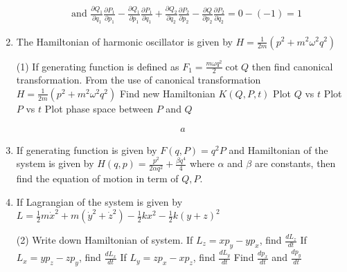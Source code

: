 \begin{enumerate}
\begin{answer}
\begin{align*}
		&\text{and }
		\frac{\partial Q_{1}}{\partial q_{1}} \frac{\partial P_{1}}{\partial p_{1}}-\frac{\partial Q_{1}}{\partial p_{1}} \frac{\partial P_{1}}{\partial q_{1}}+\frac{\partial Q_{2}}{\partial q_{2}} \frac{\partial P_{2}}{\partial p_{2}}-\frac{\partial Q}{\partial p_{2}} \frac{\partial P_{2}}{\partial q_{2}}=0-(-1)=1
		\end{align*}
	\end{answer}
	\item The Hamiltonian of harmonic oscillator is given by $H=\frac{1}{2 m}\left(p^{2}+m^{2} \omega^{2} q^{2}\right)$
\begin{tasks}(1)
	\task[\textbf{a.}]If generating function is defined as $F_{1}=\frac{m \omega q^{2}}{2} \cot Q$ then find canonical transformation.
	From the use of canonical transformation $H=\frac{1}{2 m}\left(p^{2}+m^{2} \omega^{2} q^{2}\right)$
	\task[\textbf{b.}]Find new Hamiltonian $K(Q, P, t)$
	\task[\textbf{c.}] Plot $Q$ vs $t$
	\task[\textbf{d.}]  Plot $P$ vs $t$
	\task[\textbf{e.}]Plot phase space between $P$ and $Q$
\end{tasks} 
\begin{answer}
	\begin{align*}
	a
	\end{align*}
\end{answer}
	\item If generating function is given by $F(q, P)=q^{2} P$ and Hamiltonian of the system is given by $H(q, p)=\frac{p^{2}}{2 \alpha q^{2}}+\frac{\beta q^{4}}{4}$ where $\alpha$ and $\beta$ are constants, then find the equation of motion in term of $Q, P$.
	\item If Lagrangian of the system is given by $L=\frac{1}{2} m \dot{x}^{2}+m\left(\dot{y}^{2}+\dot{z}^{2}\right)-\frac{1}{2} k x^{2}-\frac{1}{2} k(y+z)^{2}$
	 \begin{tasks}(2)
		\task[\textbf{a.}]Write down Hamiltonian of system.
		\task[\textbf{b.}]If $L_{z}=x p_{y}-y p_{x}$, find $\frac{d L_{z}}{d t}$
		\task[\textbf{c.}]If $L_{x}=y p_{z}-z p_{y}$, find $\frac{d L_{x}}{d t}$
		\task[\textbf{d.}] If $L_{y}=z p_{x}-x p_{z}$, find $\frac{d L_{y}}{d t}$
		\task[\textbf{e.}] Find $\frac{d p_{x}}{d t}$ and $\frac{d p_{y}}{d t}$
	\end{tasks}
\end{enumerate}